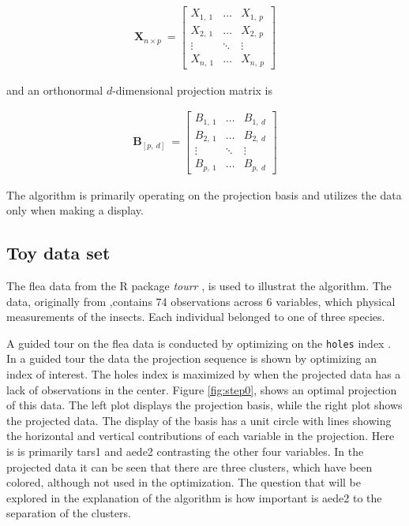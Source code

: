 \documentclass{monashthesis}
\begin{document}
\begin{align*}
  \textbf{X}_{n \times p} ~=
  \begin{bmatrix}
    X_{1,~1} & \dots  & X_{1,~p} \\
    X_{2,~1} & \dots  & X_{2,~p} \\
    \vdots   & \ddots & \vdots   \\
    X_{n,~1} & \dots  & X_{n,~p}
  \end{bmatrix}
\end{align*}

and an orthonormal \(d\)-dimensional projection matrix is

\begin{align*}
  \textbf{B}_{[p,~d]} ~=
  \begin{bmatrix}
    B_{1,~1} & \dots  & B_{1,~d} \\
    B_{2,~1} & \dots  & B_{2,~d} \\
    \vdots   & \ddots & \vdots   \\
    B_{p,~1} & \dots  & B_{p,~d}
  \end{bmatrix}
\end{align*}

The algorithm is primarily operating on the projection basis and utilizes the data only when making a display.

\hypertarget{toy-data-set}{%
\subsection{Toy data set}\label{toy-data-set}}

The flea data from the R package \emph{tourr} \autocite{wickham_tourr_2011}, is used to illustrat the algorithm. The data, originally from \textcite{lubischew_use_1962},contains 74 observations across 6 variables, which physical measurements of the insects. Each individual belonged to one of three species.

A guided tour on the flea data is conducted by optimizing on the \texttt{holes} index \autocite{cook_interactive_2007}. In a guided tour the data the projection sequence is shown by optimizing an index of interest. The holes index is maximized by when the projected data has a lack of observations in the center. Figure \ref{fig:step0}, shows an optimal projection of this data. The left plot displays the projection basis, while the right plot shows the projected data. The display of the basis has a unit circle with lines showing the horizontal and vertical contributions of each variable in the projection. Here is is primarily tars1 and aede2 contrasting the other four variables. In the projected data it can be seen that there are three clusters, which have been colored, although not used in the optimization. The question that will be explored in the explanation of the algorithm is how important is aede2 to the separation of the clusters.
\end{document}
